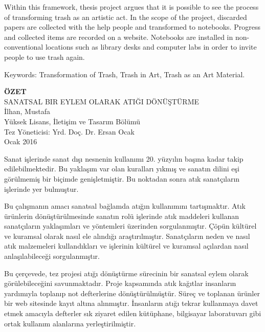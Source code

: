\documentclass[12pt]{report}
\begin{document}
Within this framework, thesis project argues that it is possible to see the process of transforming trash as an artistic act. In the scope of the project, discarded papers are collected with the help people and transformed to notebooks. Progress and collected items are recorded on a website. Notebooks are installed in non-conventional locations such as library desks and computer labs in order to invite people to use trash again. 

\noindent Keywords: Transformation of Trash, Trash in Art, Trash as an Art Material.
\clearpage


\thispagestyle{plain}
{}
\doublespacing
\begin{center}
	\vspace*{8.5mm}
	{\fontsize{14pt}{14pt}\selectfont \textbf{\MakeUppercase{Özet}}}\\
    \vspace{\baselineskip}
    \MakeUppercase{Sanatsal Bir Eylem Olarak Atığı Dönüştürme}\\
    İlhan, Mustafa\\
    Yüksek Lisans, İletişim ve Tasarım Bölümü\\
    Tez Yöneticisi: Yrd. Doç. Dr. Ersan Ocak\\
    \vspace{\baselineskip}
    Ocak 2016
\end{center}
\singlespacing
\par Sanat işlerinde sanat dışı nesnenin kullanımı 20. yüzyılın başına kadar takip edilebilmektedir. Bu yaklaşım var olan kuralları yıkmış ve sanatın dilini eşi görülmemiş bir biçimde genişletmiştir. Bu noktadan sonra atık sanatçıların işlerinde yer bulmuştur.

Bu çalışmanın amacı sanatsal bağlamda atığın kullanımını tartışmaktır. Atık ürünlerin dönüştürülmesinde sanatın rolü işlerinde atık maddeleri kullanan sanatçıların yaklaşımları ve yöntemleri üzerinden sorgulanmıştır. Çöpün kültürel ve kuramsal olarak nasıl ele alındığı araştırılmıştır. Sanatçıların neden ve nasıl atık malzemeleri kullandıkları ve işlerinin kültürel ve kuramsal açılardan nasıl anlaşılabileceği sorgulanmıştır.

Bu çerçevede, tez projesi atığı dönüştürme sürecinin bir sanatsal eylem olarak görülebileceğini savunmaktadır. Proje kapsamında atık kağıtlar insanların yardımıyla toplanıp not defterlerine dönüştürülmüştür. Süreç ve toplanan ürünler bir web sitesinde kayıt altına alınmıştır. İnsanların atığı tekrar kullanmaya davet etmek amacıyla defterler sık ziyaret edilen kütüphane, bilgisayar laboratuvarı gibi ortak kullanım alanlarına yerleştirilmiştir.
\end{document}
